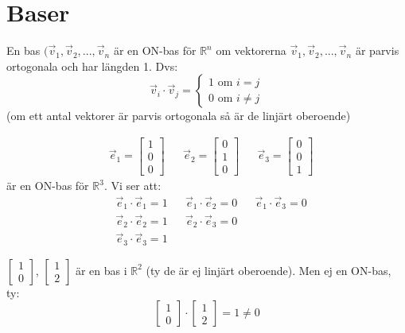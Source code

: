 \section{Baser} %
\label{sec:baser}
En bas $(\vec{v}_1, \vec{v}_2,...,\vec{v}_n$ är en ON-bas för $\mathbb{R}^n$ om vektorerna $\vec{v}_1, \vec{v}_2,...,\vec{v}_n$ är parvis ortogonala och har längden 1. Dvs:
\[
\vec{v}_i \cdot \vec{v}_j = 
\begin{cases}
	1 \text{ om } i = j\\
	0 \text{ om } i \neq j
\end{cases}
\]
(om ett antal vektorer är parvis ortogonala så är de linjärt oberoende)
\begin{Ex}
	\begin{align*}
	&\vec{e}_1 = \begin{bmatrix} 1\\0\\0 \end{bmatrix}
	&&\vec{e}_2 = \begin{bmatrix} 0\\1\\0 \end{bmatrix}
	&&\vec{e}_3 = \begin{bmatrix} 0\\0\\1 \end{bmatrix}
	\end{align*}
	är en ON-bas för $\mathbb{R}^3$. Vi ser att:
	\begin{align*}
	&\vec{e}_1 \cdot \vec{e}_1 = 1
	&&\vec{e}_1 \cdot \vec{e}_2 = 0
	&&\vec{e}_1 \cdot \vec{e}_3 = 0
	\\
	&\vec{e}_2 \cdot \vec{e}_2 = 1
	&&\vec{e}_2 \cdot \vec{e}_3 = 0
	\\
	&\vec{e}_3 \cdot \vec{e}_3 = 1
	\end{align*}
\end{Ex}

\begin{Ex}
	$\begin{bmatrix} 1\\0 \end{bmatrix}$, $\begin{bmatrix} 1\\2 \end{bmatrix}$ är en bas i $\mathbb{R}^2$ (ty de är ej linjärt oberoende). Men ej en ON-bas, ty:
	\[
	\begin{bmatrix} 1\\0 \end{bmatrix} \cdot \begin{bmatrix} 1\\2 \end{bmatrix} = 1 \neq 0
	\]
\end{Ex}
